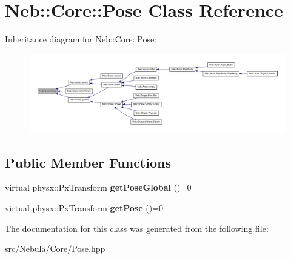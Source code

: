 \hypertarget{classNeb_1_1Core_1_1Pose}{\section{\-Neb\-:\-:\-Core\-:\-:\-Pose \-Class \-Reference}
\label{classNeb_1_1Core_1_1Pose}
}


\-Inheritance diagram for \-Neb\-:\-:\-Core\-:\-:\-Pose\-:
\nopagebreak
\begin{figure}[H]
\begin{center}
\leavevmode
\includegraphics[width=350pt]{classNeb_1_1Core_1_1Pose__inherit__graph}
\end{center}
\end{figure}
\subsection*{\-Public \-Member \-Functions}
\begin{DoxyCompactItemize}
\item 
\hypertarget{classNeb_1_1Core_1_1Pose_a68344a73874b28cfc25608c802c030ca}{virtual physx\-::\-Px\-Transform {\bfseries get\-Pose\-Global} ()=0}\label{classNeb_1_1Core_1_1Pose_a68344a73874b28cfc25608c802c030ca}

\item 
\hypertarget{classNeb_1_1Core_1_1Pose_a85727b01252cd84bfe2d99fedbacd29f}{virtual physx\-::\-Px\-Transform {\bfseries get\-Pose} ()=0}\label{classNeb_1_1Core_1_1Pose_a85727b01252cd84bfe2d99fedbacd29f}

\end{DoxyCompactItemize}


\-The documentation for this class was generated from the following file\-:\begin{DoxyCompactItemize}
\item 
src/\-Nebula/\-Core/\-Pose.\-hpp\end{DoxyCompactItemize}
